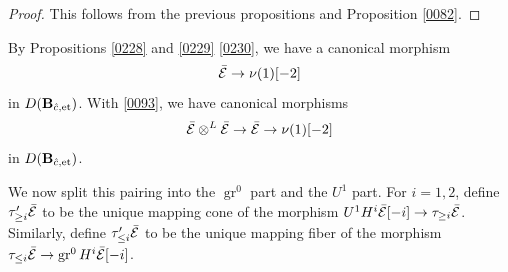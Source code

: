 \documentclass{amsart}
\theoremstyle{remark}
\numberwithin{equation}{subsection}
\newcommand{\tensor}{\mathbin{\otimes}}
\newcommand{\et}{\mathrm{et}}
\newcommand{\alg}[1]{\mathbf{#1}}
\DeclareMathOperator{\gr}{gr}
\begin{document}
\begin{proof}
	This follows from the previous propositions
	and Proposition \ref{0082}.
\end{proof}

By Propositions \ref{0228} and \ref{0229} \eqref{0230}, we have a canonical morphism
	\begin{equation} \label{0351}
			\Bar{\mathcal{E}}
		\to
			\nu(1)[-2]
	\end{equation}
in $D(\alg{B}_{\Hat{c}, \et})$.
With \eqref{0093}, we have canonical morphisms
	\begin{equation} \label{0095}
			\Bar{\mathcal{E}} \tensor^{L} \Bar{\mathcal{E}}
		\to
			\Bar{\mathcal{E}}
		\to
			\nu(1)[-2]
	\end{equation}
in $D(\alg{B}_{\Hat{c}, \et})$.

We now split this pairing into the $\gr^{0}$ part and the $U^{1}$ part.
For $i = 1, 2$, define $\tau_{\ge i}' \Bar{\mathcal{E}}$ to be the unique mapping cone of
the morphism $U^{1} H^{i} \Bar{\mathcal{E}}[-i] \to \tau_{\ge i} \Bar{\mathcal{E}}$.
Similarly, define $\tau_{\le i}' \Bar{\mathcal{E}}$ to be the unique mapping fiber of
the morphism $\tau_{\le i} \Bar{\mathcal{E}} \to \gr^{0} H^{i} \Bar{\mathcal{E}}[-i]$.
\end{document}
